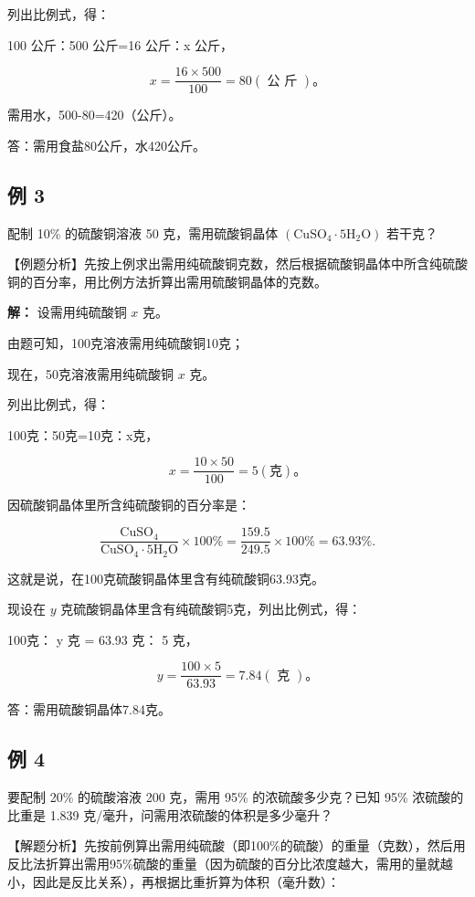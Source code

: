 列出比例式，得：

100 公斤：500 公斤=16 公斤：x 公斤，

\[
x = \frac {16 \times 500}{100} = 80 (\text{ 公 斤 })\text{。}
\]

需用水，500-80=420（公斤）。

答：需用食盐80公斤，水420公斤。

\subsection{例 3}

配制 10\% 的硫酸铜溶液 50 克，需用硫酸铜晶体
\(\left(\mathrm{CuSO}_{4} \cdot 5\mathrm{H}_{2}\mathrm{O}\right)\)
若干克？

【例题分析】先按上例求出需用纯硫酸铜克数，然后根据硫酸铜晶体中所含纯硫酸铜的百分率，用比例方法折算出需用硫酸铜晶体的克数。

\textbf{解：} 设需用纯硫酸铜 \(x\) 克。

由题可知，100克溶液需用纯硫酸铜10克；

现在，50克溶液需用纯硫酸铜 \(x\) 克。

列出比例式，得：

100克：50克=10克：x克，

\[
x = \frac {10 \times 50}{100} = 5 (\text{克})\text{。}
\]

因硫酸铜晶体里所含纯硫酸铜的百分率是：

\[
\frac {\mathrm{CuSO}_{4}}{\mathrm{CuSO}_{4} \cdot 5 \mathrm{H}_{2} \mathrm{O}} \times 100 \% = \frac {159.5}{249.5} \times 100 \% = 63.93 \%.
\]

这就是说，在100克硫酸铜晶体里含有纯硫酸铜63.93克。

现设在 \(y\) 克硫酸铜晶体里含有纯硫酸铜5克，列出比例式，得：

100克： y 克 = 63.93 克： 5 克，

\[
y = \frac {100 \times 5}{63.93} = 7.84 (\text{ 克 })\text{。}
\]

答：需用硫酸铜晶体7.84克。

\subsection{例 4}

要配制 20\% 的硫酸溶液 200 克，需用 95\% 的浓硫酸多少克？已知 95\%
浓硫酸的比重是 1.839 克/毫升，问需用浓硫酸的体积是多少毫升？

【解题分析】先按前例算出需用纯硫酸（即100\%的硫酸）的重量（克数），然后用反比法折算出需用95\%硫酸的重量（因为硫酸的百分比浓度越大，需用的量就越小，因此是反比关系），再根据比重折算为体积（毫升数）：

